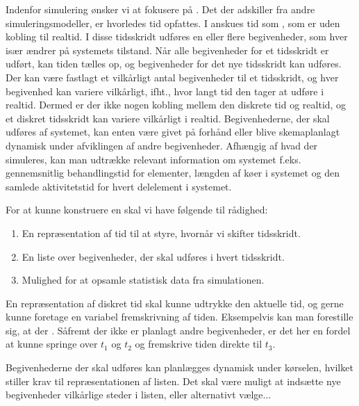 Indenfor simulering ønsker vi at fokusere på \des. Det der adskiller \des fra andre simuleringsmodeller, er hvorledes tid opfattes. I \des anskues tid som , som er uden kobling til realtid. I disse tidsskridt udføres en eller flere begivenheder, som hver især ændrer på systemets tilstand. Når alle begivenheder for et tidsskridt er udført, kan tiden tælles op, og begivenheder for det nye tidsskridt kan udføres. Der kan være fastlagt et vilkårligt antal begivenheder til et tidsskridt, og hver begivenhed kan variere vilkårligt, ifht., hvor langt tid den tager at udføre i realtid. Dermed er der ikke nogen kobling mellem den diskrete tid og realtid, og et diskret tidsskridt kan variere vilkårligt i realtid. Begivenhederne, der skal udføres af systemet, kan enten være givet på forhånd eller blive skemaplanlagt dynamisk under afviklingen af andre begivenheder. 
Afhængig af hvad der simuleres, kan man udtrække relevant information om systemet f.eks. gennemsnitlig behandlingstid for elementer, længden af køer i systemet og den samlede aktivitetstid for hvert delelement i systemet.

For at kunne konstruere en \des skal vi have følgende til rådighed: 
\begin{enumerate}
\tightlist 
\item En repræsentation af tid til at styre, hvornår vi skifter tidsskridt.
\item En liste over begivenheder, der skal udføres i hvert tidsskridt.
\item Mulighed for at opsamle statistisk data fra simulationen. 
\end{enumerate}
En repræsentation af diskret tid skal kunne udtrykke den aktuelle tid,  og gerne kunne foretage en variabel fremskrivning af tiden. Eksempelvis kan man forestille sig, at der . Såfremt der ikke er planlagt andre begivenheder, er det her en fordel at kunne springe over $t_{1}$ og $t_{2}$ og fremskrive tiden direkte til $t_{3}$. 

Begivenhederne der skal udføres kan planlægges dynamisk under kørselen, hvilket stiller krav til repræsentationen af listen. Det skal være muligt at indsætte nye begivenheder vilkårlige steder i listen, eller alternativt vælge...




